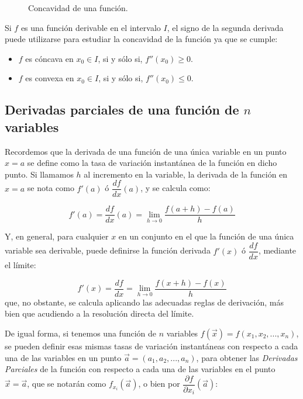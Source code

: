\begin{figure}[h!]
\centering {}\qquad
{}
\caption{Concavidad de una función.}
\label{g:concavidad_derivada}
\end{figure}


Si $f$ es una función derivable en el intervalo $I$, el signo de la
segunda derivada puede utilizarse para estudiar la concavidad de la
función ya que se cumple:
\begin{itemize}
\item $f$ es cóncava en $x_0\in I$, si y sólo si, $f''(x_0)\geq 0$.
\item $f$ es convexa en $x_0\in I$, si y sólo si, $f''(x_0)\leq 0$.
\end{itemize}


\subsection{Derivadas parciales de una función de $n$ variables}

Recordemos que la derivada de una función de una única variable en
un punto $x=a$ se define como la tasa de variación instantánea de la
función en dicho punto. Si llamamos $h$ al incremento en la
variable, la derivada de la función en $x=a$ se nota como $f'(a)$ ó
$\dfrac{{df}} {{dx}}(a)$, y se calcula como:


\[
f'(a) = \frac{df}{dx}(a) = \mathop {\lim
}\limits_{h \to 0} \frac{{f(a + h) - f(a)}} {h}
\]


Y, en general, para cualquier $x$ en un conjunto en el que la
función de una única variable sea derivable, puede definirse la
función derivada $f'(x)$ ó $\dfrac{df}{dx}$,
mediante el límite:

\[
f'(x) = \frac{df}{dx} = \mathop {\lim }\limits_{h
\to 0} \frac{{f(x + h) - f(x)}} {h}
\]
que, no obstante, se calcula aplicando las adecuadas reglas de
derivación, más bien que acudiendo a la resolución directa del
límite.

De igual forma, si tenemos una función de $n$ variables
$f(\vec{x})=f(x_1,x_2,...,x_n)$, se pueden definir esas mismas tasas
de variación instantáneas con respecto a cada una de las variables
en un punto $\vec{a}=(a_1,a_2,...,a_n)$, para obtener las
\emph{Derivadas Parciales} de la función con respecto a cada una de
las variables en el punto $\vec{x}=\vec{a}$, que se notarán como
$f_{x_i}(\vec{a})$, o bien por $\dfrac{\partial f}{\partial
x_i}(\vec{a})$:



